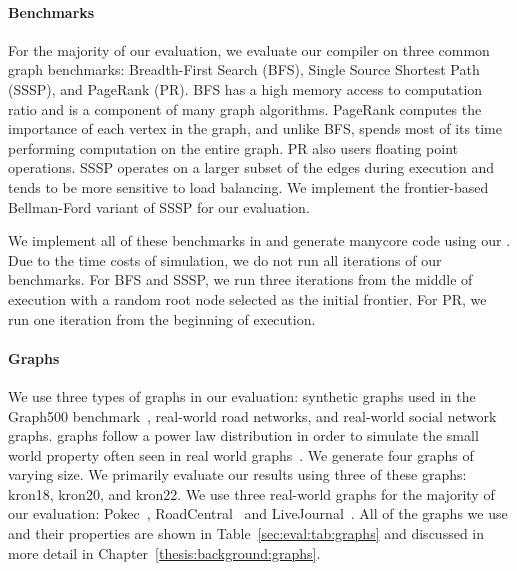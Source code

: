 \paragraph{Benchmarks} For the majority of our evaluation, we evaluate our compiler on three common graph benchmarks: Breadth-First Search (BFS), Single Source Shortest Path (SSSP), and PageRank (PR). 
BFS has a high memory access to computation ratio and is a component of many graph algorithms.
PageRank computes the importance of each vertex in the graph, and unlike BFS, spends most of its time performing computation on the entire graph.
PR also users floating point operations.
SSSP operates on a larger subset of the edges during execution and tends to be more sensitive to load balancing.
We implement the frontier-based Bellman-Ford variant of SSSP for our evaluation.

We implement all of these benchmarks in \graphit and generate manycore code using our \hb \graphvm.
Due to the time costs of simulation, we do not run all iterations of our benchmarks. 
For BFS and SSSP, we run three iterations from the middle of execution with a random root node selected as the initial frontier.
For PR, we run one iteration from the beginning of execution.



\paragraph{Graphs} We use three types of graphs in our evaluation: synthetic \kron graphs used in the Graph500 benchmark~\cite{murphy2010graph500}, real-world road networks, and real-world social network graphs.
\kron graphs follow a power law distribution in order to simulate the small world property often seen in real world graphs~\cite{leskovec2010kronecker}.
We generate four \kron graphs of varying size. 
We primarily evaluate our results using three of these graphs: kron18, kron20, and kron22.
We use three real-world graphs for the majority of our evaluation: Pokec~\cite{pokec}, RoadCentral~\cite{davis2011university} and LiveJournal~\cite{lj}.
All of the graphs we use and their properties are shown in Table~\ref{sec:eval:tab:graphs} and discussed in more detail in Chapter~\ref{thesis:background:graphs}.


